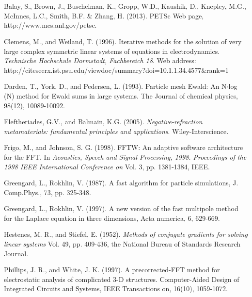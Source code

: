 \documentclass[12pt]{elsarticle}
\numberwithin{equation}{section}
\begin{document}
\section*{\refname}

\begin{thebibliography}{0}
 Balay, S., Brown, J., Buschelman, K., Gropp, W.D., Kaushik, D., Knepley, M.G., McInnes, L.C., Smith, B.F. \& Zhang, H. (2013). {PETSc} {W}eb page, http://www.mcs.anl.gov/petsc.

 Clemens, M., and Weiland, T. (1996). Iterative methods for the solution of very large complex symmetric linear systems of equations in electrodynamics. \textit{Technische Hochschule Darmstadt, Fachbereich 18}. Web address: http://citeseerx.ist.psu.edu/viewdoc/summary?doi=10.1.1.34.4577\&rank=1

 Darden, T., York, D., and Pedersen, L. (1993). Particle mesh Ewald: An N$\cdot$log (N) method for Ewald sums in large systems. The Journal of chemical physics, 98(12), 10089-10092.

 Eleftheriades, G.V., and Balmain, K.G. (2005). \textit{Negative-refraction metamaterials: fundamental principles and applications}. Wiley-Interscience.

 Frigo, M., and Johnson, S. G. (1998). FFTW: An adaptive software architecture for the FFT. In \textit{Acoustics, Speech and Signal Processing, 1998. Proceedings of the 1998 IEEE International Conference on} Vol. 3, pp. 1381-1384, IEEE.

 Greengard, L., Rokhlin, V. (1987). A fast algorithm for particle simulations,
J. Comp.Phys., 73, pp. 325-348.

  Greengard, L., Rokhlin, V. (1997). A new version of the fast multipole method for the Laplace equation in three dimensions, Acta numerica, 6, 629-669.

 Hestenes, M. R., and Stiefel, E. (1952). \textit{Methods of conjugate gradients for solving linear systems} Vol. 49, pp. 409-436, the National Bureau of Standards Research Journal.

 Phillips, J. R., and White, J. K. (1997). A precorrected-FFT method for electrostatic analysis of complicated 3-D structures. Computer-Aided Design of Integrated Circuits and Systems, IEEE Transactions on, 16(10), 1059-1072.


\end{thebibliography}
\end{document}
